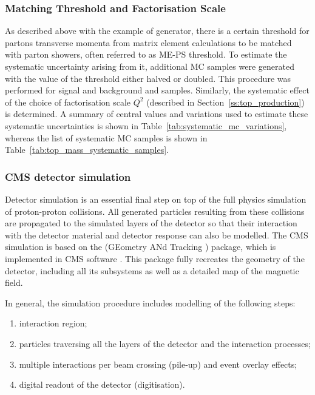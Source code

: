 \subsubsection{Matching Threshold and Factorisation Scale}
\label{sss_top_mass:matching_and_factorisation}

As described above with the example of \MADGRAPH generator, there is a certain threshold for partons transverse momenta
from matrix element calculations to be matched with parton showers, often referred to as ME-PS threshold. To estimate
the systematic uncertainty arising from it, additional MC samples were generated with the value of the threshold either
halved or doubled. This procedure was performed for signal \ttjets and background \WpJets and \ZpJets samples.
Similarly, the systematic effect of the choice of factorisation scale $Q^2$ (described in
Section~\ref{ss:top_production}) is determined. A summary of central values and variations used to estimate these
systematic uncertainties is shown in Table~\ref{tab:systematic_mc_variations}, whereas the list of systematic MC samples
is shown in Table~\ref{tab:top_mass_systematic_samples}.



\subsubsection{CMS detector simulation}
\label{sss_top_mass:detector_simulation}

Detector simulation is an essential final step on top of the full physics simulation of proton-proton collisions. All
generated particles resulting from these collisions are propagated to the simulated layers of the detector so that their
interaction with the detector material and detector response can also be modelled. The CMS simulation is based on the
\GEANTfour (GEometry ANd Tracking \autocite{GEANT4}) package, which is implemented in CMS software \CMSSW
\autocite{CMSSW}. This package fully recreates the geometry of the detector, including all its subsystems as well as a
detailed map of the magnetic field.

In general, the simulation procedure includes modelling of the following steps:
\begin{enumerate}[label=\textbullet]
	\item interaction region;
	\item particles traversing all the layers of the detector and the interaction processes;
	\item multiple interactions per beam crossing (pile-up) and event overlay effects;
	\item digital readout of the detector (digitisation).
\end{enumerate}

